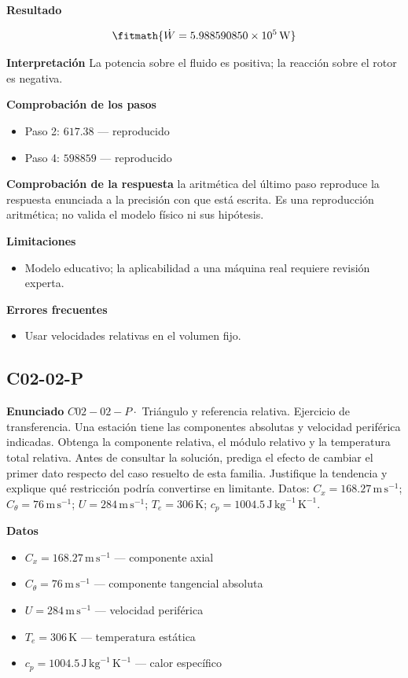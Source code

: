 \documentclass[10pt,openany]{book}
\begin{document}
\noindent\textbf{Resultado}

\[
\fitmath{\dot{W}=5.988590850\times10^{5}\,\mathrm{W}}
\]

\noindent\textbf{Interpretación}
La potencia sobre el fluido es positiva; la reacción sobre el rotor es negativa.

\noindent\textbf{Comprobación de los pasos}
\begin{itemize}
\item Paso 2: $617.38$ — reproducido
\item Paso 4: $598859$ — reproducido
\end{itemize}

\noindent\textbf{Comprobación de la respuesta} la aritmética del último paso reproduce la respuesta enunciada a la precisión con que está escrita. Es una reproducción aritmética; no valida el modelo físico ni sus hipótesis.

\noindent\textbf{Limitaciones}
\begin{itemize}
\item Modelo educativo; la aplicabilidad a una máquina real requiere revisión experta.
\end{itemize}

\noindent\textbf{Errores frecuentes}
\begin{itemize}
\item Usar velocidades relativas en el volumen fijo.
\end{itemize}
\subsection*{C02-02-P}

\noindent\textbf{Enunciado}
\(C02-02-P \cdot\) Triángulo y referencia relativa. Ejercicio de transferencia. Una estación tiene las componentes absolutas y velocidad periférica indicadas. Obtenga la componente relativa, el módulo relativo y la temperatura total relativa. Antes de consultar la solución, prediga el efecto de cambiar el primer dato respecto del caso resuelto de esta familia. Justifique la tendencia y explique qué restricción podría convertirse en limitante. Datos: \(C_x=168.27\, \mathrm{m}\,\mathrm{s}^{-1}\); \(C_\theta=76\, \mathrm{m}\,\mathrm{s}^{-1}\); \(U=284\, \mathrm{m}\,\mathrm{s}^{-1}\); \(T_e=306\, \mathrm{K}\); \(c_p=1004.5\, \mathrm{J}\,\mathrm{kg}^{-1}\,\mathrm{K}^{-1}\).

\noindent\textbf{Datos}
\begin{itemize}
\item $C_x = 168.27\,\mathrm{m}\,\mathrm{s}^{-1}$ — componente axial
\item $C_\theta = 76\,\mathrm{m}\,\mathrm{s}^{-1}$ — componente tangencial absoluta
\item $U = 284\,\mathrm{m}\,\mathrm{s}^{-1}$ — velocidad periférica
\item $T_e = 306\,\mathrm{K}$ — temperatura estática
\item $c_p = 1004.5\,\mathrm{J}\,\mathrm{kg}^{-1}\,\mathrm{K}^{-1}$ — calor específico
\end{itemize}
\end{document}
